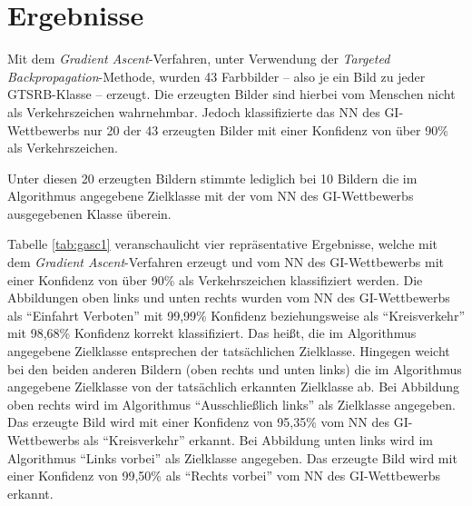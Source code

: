 \section{Ergebnisse}
Mit dem \textit{Gradient Ascent}-Verfahren, unter Verwendung der \textit{Targeted Backpropagation}-Methode, wurden 43 Farbbilder – also je ein Bild zu jeder \ac{GTSRB}-Klasse – erzeugt. 
Die erzeugten Bilder sind hierbei vom Menschen nicht als Verkehrszeichen wahrnehmbar. 
Jedoch klassifizierte das \ac{NN} des \ac{GI}-Wettbewerbs nur 20 der 43 erzeugten Bilder mit einer Konfidenz von über 90\% als Verkehrszeichen. 

Unter diesen 20 erzeugten Bildern stimmte lediglich bei 10 Bildern die im Algorithmus angegebene Zielklasse mit der vom \ac{NN} des \ac{GI}-Wettbewerbs ausgegebenen Klasse überein.

Tabelle \ref{tab:gasc1} veranschaulicht vier repräsentative Ergebnisse, welche mit dem \textit{Gradient Ascent}-Verfahren erzeugt und vom \ac{NN} des \ac{GI}-Wettbewerbs mit einer Konfidenz von über 90\% als Verkehrszeichen klassifiziert werden.
Die Abbildungen oben links und unten rechts wurden vom \ac{NN} des \ac{GI}-Wettbewerbs als "`Einfahrt Verboten"' mit 99,99\% Konfidenz beziehungsweise als "`Kreisverkehr"' mit 98,68\% Konfidenz korrekt klassifiziert. 
Das heißt, die im Algorithmus angegebene Zielklasse entsprechen der tatsächlichen Zielklasse.
Hingegen weicht bei den beiden anderen Bildern (oben rechts und unten links) die im Algorithmus angegebene Zielklasse von der tatsächlich erkannten Zielklasse ab. 
Bei Abbildung oben rechts wird im Algorithmus "`Ausschließlich links"' als Zielklasse angegeben. 
Das erzeugte Bild wird mit einer Konfidenz von 95,35\% vom \ac{NN} des \ac{GI}-Wettbewerbs als "`Kreisverkehr"' erkannt.
Bei Abbildung unten links wird im Algorithmus "`Links vorbei"' als Zielklasse angegeben. 
Das erzeugte Bild wird mit einer Konfidenz von 99,50\% als "`Rechts vorbei"' vom \ac{NN} des \ac{GI}-Wettbewerbs erkannt.


